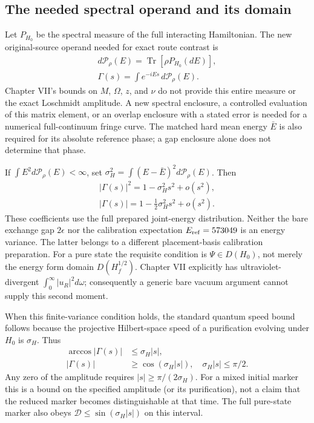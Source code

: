 \subsection{The needed spectral operand and its domain}
\label{sec:ch6-spectral-clock-operand}
Let $P_{H_0}$ be the spectral measure of the full interacting Hamiltonian.
The new original-source operand needed for exact route contrast is
\begin{equation}
\begin{gathered}
d\mathcal P_\rho(E)=\operatorname{Tr}[\rho P_{H_0}(dE)],\\
 \Gamma(s)=\int e^{-iEs}\,d\mathcal P_\rho(E).
\end{gathered}
\label{eq:ch6-spectral-operand}
\end{equation}
Chapter VII's bounds on $M$, $\Omega$, $z$, and $\nu$ do not provide this
entire measure or the exact Loschmidt amplitude. A new spectral enclosure,
a controlled evaluation of this matrix element, or an overlap enclosure
with a stated error is needed for a numerical full-continuum fringe curve.
The matched hard mean energy $\bar E$ is also required for its absolute
reference phase; a gap enclosure alone does not determine that phase.

If $\int E^2d\mathcal P_\rho(E)<\infty$, set
$\sigma_H^2=\int(E-\bar E)^2d\mathcal P_\rho(E)$. Then
\begin{equation}
\begin{gathered}
|\Gamma(s)|^2=1-\sigma_H^2s^2+o(s^2),\\
 |\Gamma(s)|=1-\tfrac12\sigma_H^2s^2+o(s^2).
\end{gathered}
\label{eq:ch6-short-time-contrast}
\end{equation}
These coefficients use the full prepared joint-energy distribution.
Neither the bare exchange gap $2\epsilon$ nor the calibration expectation
$E_{\rm ref}=573049$ is an energy variance. The latter belongs to a different
placement-basis calibration preparation. For a pure state the requisite
condition is $\Psi\in D(H_0)$, not merely the energy form domain
$D(H_f^{1/2})$. Chapter VII explicitly has ultraviolet-divergent
$\int_0^\infty|u_R|^2d\omega$; consequently a generic bare vacuum argument
cannot supply this second moment.

When this finite-variance condition holds, the standard quantum speed
bound~\cite{Fleming1973,DeffnerCampbell2017} follows because the projective Hilbert-space
speed of a purification evolving under $H_0$ is $\sigma_H$. Thus
\begin{equation}
\begin{aligned}
 \arccos|\Gamma(s)|&\leq\sigma_H|s|,\\
 |\Gamma(s)|&\geq\cos(\sigma_H|s|),
 \quad \sigma_H|s|\leq\pi/2.
\end{aligned}
 \label{eq:ch6-speed-bound}
\end{equation}
Any zero of the amplitude requires $|s|\geq\pi/(2\sigma_H)$.
For a mixed initial marker this is a bound on the specified amplitude (or its
purification), not a claim that the reduced marker becomes distinguishable
at that time. The full pure-state marker also obeys
$\mathcal D\leq\sin(\sigma_H|s|)$ on this interval.

